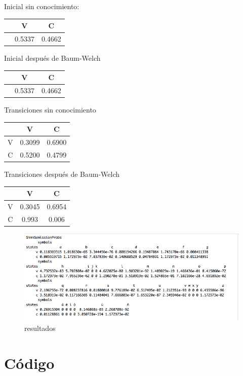 \documentclass[]{article}
\begin{document}
Inicial sin conocimiento:

\begin{longtable}[c]{@{}ccc@{}}
\toprule
& V & C\tabularnewline
\midrule
\endhead
& 0.5337 & 0.4662\tabularnewline
\bottomrule
\end{longtable}

Inicial después de Baum-Welch

\begin{longtable}[c]{@{}ccc@{}}
\toprule
& V & C\tabularnewline
\midrule
\endhead
& 0.5337 & 0.4662\tabularnewline
\bottomrule
\end{longtable}

Transiciones sin conocimiento

\begin{longtable}[c]{@{}ccc@{}}
\toprule
& V & C\tabularnewline
\midrule
\endhead
V & 0.3099 & 0.6900\tabularnewline
C & 0.5200 & 0.4799\tabularnewline
\bottomrule
\end{longtable}

Transiciones después de Baum-Welch

\begin{longtable}[c]{@{}ccc@{}}
\toprule
& V & C\tabularnewline
\midrule
\endhead
V & 0.3045 & 0.6954\tabularnewline
C & 0.993 & 0.006\tabularnewline
\bottomrule
\end{longtable}

\begin{figure}[htbp]
\centering
\includegraphics{salida_vocales.png}
\caption{resultados}
\end{figure}

\pagebreak

\section{Código}\label{codigo}
\end{document}
